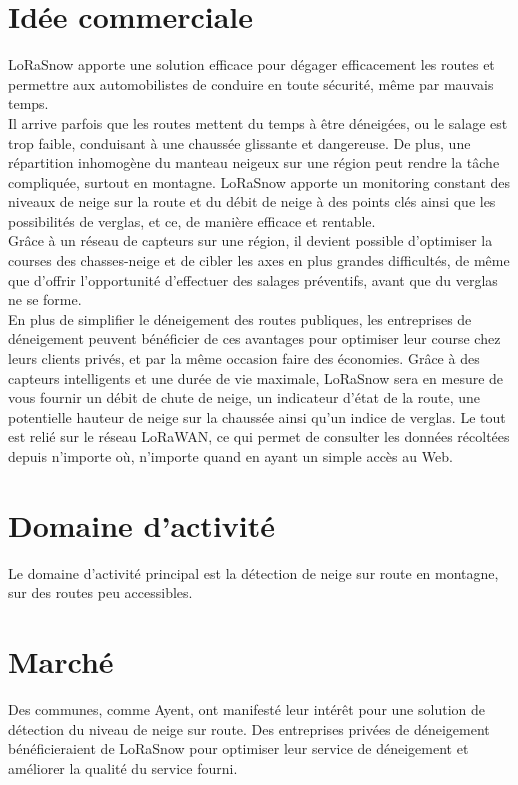 \section{Idée commerciale}
LoRaSnow apporte une solution efficace pour dégager efficacement les routes et permettre
aux automobilistes de conduire en toute sécurité, même par mauvais temps.\\
Il arrive parfois que les routes mettent du temps à être déneigées,
ou le salage est trop faible, conduisant à une chaussée glissante et dangereuse.
De plus, une répartition inhomogène du manteau neigeux sur une région peut rendre
la tâche compliquée, surtout en montagne. LoRaSnow apporte un monitoring constant
des niveaux de neige sur la route et du débit de neige à des points clés ainsi que
les possibilités de verglas, et ce, de manière efficace et rentable.\\[0.2cm]
Grâce à un réseau de capteurs sur une région,
il devient possible d'optimiser la courses des chasses-neige et de cibler les axes
en plus grandes difficultés, de même que d'offrir l'opportunité d'effectuer
des salages préventifs, avant que du verglas ne se forme.\\[0.2cm]
En plus de simplifier le déneigement des routes publiques, les entreprises de déneigement
peuvent bénéficier de ces avantages pour optimiser leur course chez leurs clients privés,
et par la même occasion faire des économies. Grâce à des capteurs intelligents
et une durée de vie maximale, LoRaSnow sera en mesure de vous fournir un débit
de chute de neige, un indicateur d'état de la route, une potentielle hauteur de
neige sur la chaussée ainsi qu'un indice de verglas. Le tout est relié sur le réseau
LoRaWAN, ce qui permet de consulter les données récoltées depuis n'importe où,
n'importe quand en ayant un simple accès au Web.

\section{Domaine d'activité}
Le domaine d'activité principal est la détection de neige sur route en montagne,
sur des routes peu accessibles.

\section{Marché}
Des communes, comme Ayent, ont manifesté leur intérêt pour une solution
de détection du niveau de neige sur route.
Des entreprises privées de déneigement bénéficieraient de LoRaSnow pour
optimiser leur service de déneigement et améliorer la qualité du service
fourni.\newpage

